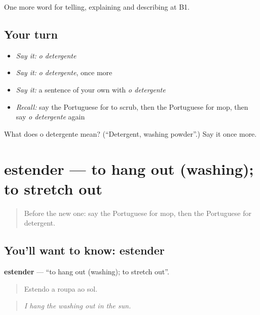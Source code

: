 \begin{grammarlens}[title={What you've built}]
One more word for telling, explaining and describing at B1.
\end{grammarlens}

\subsection*{Your turn}
\begin{itemize}
\raggedright
  \item \emph{Say it:} \emph{o detergente}
  \item \emph{Say it:} \emph{o detergente}, once more
  \item \emph{Say it:} a sentence of your own with \emph{o detergente}
  \item \emph{Recall:} say the Portuguese for to scrub, then the Portuguese for mop, then say \emph{o detergente} again
\end{itemize}

\begin{tcolorbox}[breakable,colback=teal!4,colframe=teal!35!black,title={Before you move on}]
What does o detergente mean? (\textquotedblleft{}Detergent, washing powder\textquotedblright{}.) Say it once more.
\end{tcolorbox}
\section[estender]{estender — to hang out (washing); to stretch out}

\label{lesson:PT-C529-estender}



\begin{quote}
Before the new one: say the Portuguese for mop, then the Portuguese for detergent.
\end{quote}

\subsection*{You'll want to know: estender}
\textbf{estender} — \textquotedblleft{}to hang out (washing); to stretch out\textquotedblright{}.

\begin{quote}
Estendo a roupa ao sol.
\end{quote}

\begin{quote}
\emph{I hang the washing out in the sun.}
\end{quote}

